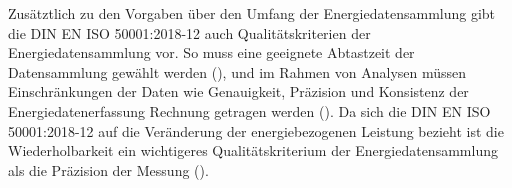 Zusätztlich zu den Vorgaben über den Umfang der Energiedatensammlung gibt die DIN EN ISO 50001:2018-12 auch Qualitätskriterien der Energiedatensammlung vor.
So muss eine geeignete Abtastzeit der Datensammlung gewählt werden (\cite[S. 20]{DIN50006.2024}), und im Rahmen von Analysen müssen Einschränkungen der Daten 
wie Genauigkeit, Präzision und Konsistenz der Energiedatenerfassung Rechnung getragen werden (\cite[S. 37]{DIN50001.2018}).  
Da sich die DIN EN ISO 50001:2018-12 auf die Veränderung der energiebezogenen Leistung bezieht ist die Wiederholbarkeit ein wichtigeres Qualitätskriterium der 
Energiedatensammlung als die Präzision der Messung (\cite[S. 3]{Szajdzicki.2017}).